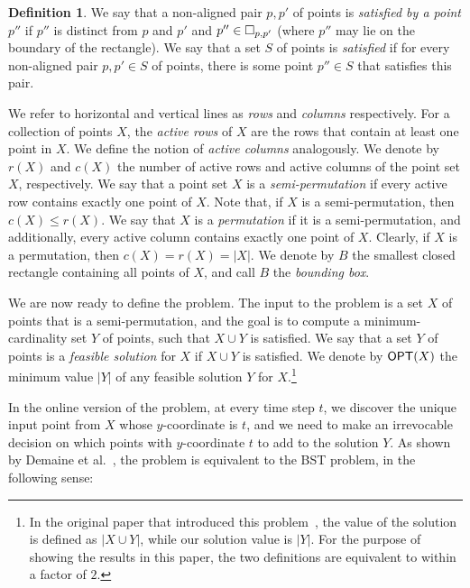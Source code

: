 \documentclass[11pt]{article}
\numberwithin{equation}{section}
\theoremstyle{definition}
\newtheorem{definition}[theorem]{Definition}
\theoremstyle{plain}
\begin{document}
	\begin{definition}
	We say that a non-aligned pair $p,p'$ of points is \emph{satisfied by a point $p''$} if $p''$ is distinct from $p$ and $p'$ and $p''\in \Box_{p,p'}$ (where $p''$ may lie on the boundary of the rectangle).
	We say that a set $S$ of points is \emph{satisfied} if for every non-aligned pair $p,p'\in S$ of points, there is some point $p''\in S$ that satisfies this pair.
	\end{definition}

	We refer to horizontal and vertical lines as \emph{rows} and \emph{columns} respectively. 
	For a collection of points $X$, the \textit{active rows} of $X$ are the rows that contain at least one point in $X$. We define the notion of \textit{active columns} analogously. 
	We denote by $r(X)$ and $c(X)$ the number of active rows and active columns of the point set $X$, respectively.
	We say that a point set $X$ is a \emph{semi-permutation} if every active row contains exactly one point of $X$.
	Note that, if $X$ is a semi-permutation, then $c(X) \le r(X)$. We say that $X$ is a \emph{permutation} if it is a semi-permutation, and additionally, every active column contains exactly one point of $X$.  
	Clearly,  if $X$ is a permutation, then $c(X)=r(X)=|X|$. 
	We denote by  $B$ the smallest closed rectangle containing all points of $X$, and call $B$ the \emph{bounding box}.
%

	We are now ready to define the  \minsat problem. 
%
%
The input to the problem is a set $X$ of points that is a semi-permutation, and the goal is to compute a minimum-cardinality set $Y$ of points, such that $X\cup Y$ is satisfied.  
	We say that a set $Y$ of points is a \emph{feasible solution} for $X$ if $X\cup Y$ is satisfied. We denote by $\mbox{\sf OPT}(X)$ the minimum value $|Y|$ of any feasible solution $Y$ for $X$.\footnote{In the original paper that introduced this problem~\cite{DHIKP09}, the value of the solution is defined as $|X \cup Y|$, while our solution value is $|Y|$. For the purpose of showing the results in this paper, the two definitions are equivalent to within a factor of $2$.}
	
%
%
%
%
%
%
In the online version of the \minsat problem, at every time step $t$, we discover the unique input point from $X$ whose $y$-coordinate is $t$, and we need to make an irrevocable decision on which points with $y$-coordinate $t$ to add to the solution $Y$.
%
%
As shown by Demaine et al.~\cite{DHIKP09},
the \minsat problem is equivalent to the BST problem, in the following sense:
%
\end{document}
